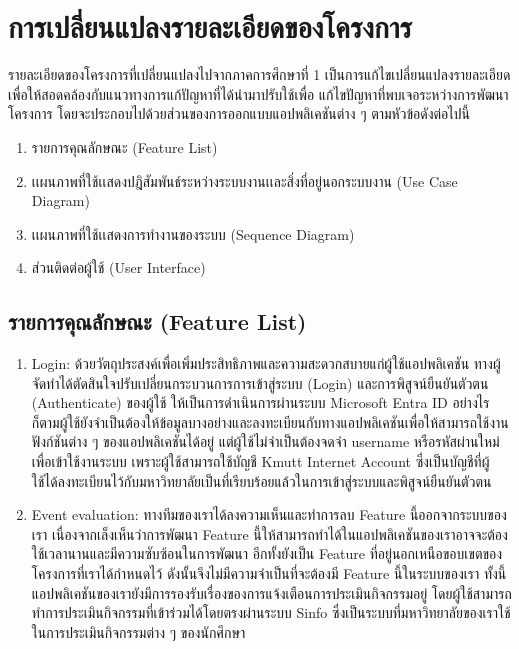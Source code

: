 \documentclass[14pt,oneside,openright,a4paper]{cpe-thai-project}
\begin{document}
\section{การเปลี่ยนแปลงรายละเอียดของโครงการ}
รายละเอียดของโครงการที่เปลี่ยนแปลงไปจากภาคการศึกษาที่ 1 เป็นการแก้ไขเปลี่ยนแปลงรายละเอียดเพื่อให้สอดคล้องกับแนวทางการแก้ปัญหาที่ได้นำมาปรับใช้เพื่อ
แก้ไขปัญหาที่พบเจอระหว่างการพัฒนาโครงการ โดยจะประกอบไปด้วยส่วนของการออกแบบแอปพลิเคชันต่าง ๆ ตามหัวข้อดังต่อไปนี้
\begin{enumerate}  
  \item รายการคุณลักษณะ (Feature List)
  \item เเผนภาพที่ใช้เเสดงปฎิสัมพันธ์ระหว่างระบบงานเเละสิ่งที่อยู่นอกระบบงาน (Use Case Diagram)
  \item เเผนภาพที่ใช้เเสดงการทํางานของระบบ (Sequence Diagram)
  \item ส่วนติดต่อผู้ใช้ (User Interface)
\end{enumerate}

  \subsection{รายการคุณลักษณะ (Feature List)}\label{subsec:editedfeaturelist}
  \begin{enumerate}  
    \item Login: ด้วยวัตถุประสงค์เพื่อเพิ่มประสิทธิภาพและความสะดวกสบายแก่ผู้ใช้แอปพลิเคชัน ทางผู้จัดทำได้ตัดสินใจปรับเปลี่ยนกระบวนการการเข้าสู่ระบบ (Login) และการพิสูจน์ยืนยันตัวตน (Authenticate) ของผู้ใช้
    ให้เป็นการดำเนินการผ่านระบบ Microsoft Entra ID อย่างไรก็ตามผู้ใช้ยังจำเป็นต้องให้ข้อมูลบางอย่างและลงทะเบียนกับทางแอปพลิเคชันเพื่อให้สามารถใช้งานฟังก์ชันต่าง ๆ ของแอปพลิเคชันได้อยู่ 
    แต่ผู้ใช้ไม่จำเป็นต้องจดจำ username หรือรหัสผ่านใหม่เพื่อเข้าใช้งานระบบ เพราะผู้ใช้สามารถใช้บัญชี Kmutt Internet Account ซึ่งเป็นบัญชีที่ผู้ใช้ได้ลงทะเบียนไว้กับมหาวิทยาลัยเป็นที่เรียบร้อยแล้วในการเข้าสู่ระบบและพิสูจน์ยืนยันตัวตน
    \item Event evaluation: ทางทีมของเราได้ลงความเห็นและทำการลบ Feature นี้ออกจากระบบของเรา เนื่องจากเล็งเห็นว่าการพัฒนา Feature นี้ให้สามารถทำได้ในแอปพลิเคชันของเราอาจจะต้องใช้เวลานานและมีความซับซ้อนในการพัฒนา อีกทั้งยังเป็น Feature ที่อยู่นอกเหนือขอบเขตของโครงการที่เราได้กำหนดไว้
    ดังนั้นจึงไม่มีความจำเป็นที่จะต้องมี Feature นี้ในระบบของเรา ทั้งนี้แอปพลิเคชันของเรายังมีการรองรับเรื่องของการแจ้งเตือนการประเมินกิจกรรมอยู่ โดยผู้ใช้สามารถทำการประเมินกิจกรรมที่เข้าร่วมได้โดยตรงผ่านระบบ Sinfo ซึ่งเป็นระบบที่มหาวิทยาลัยของเราใช้ในการประเมินกิจกรรมต่าง ๆ ของนักศึกษา
  \end{enumerate}
  
\end{document}

